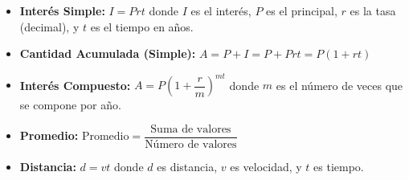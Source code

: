 \begin{itemize}
    \item \textbf{Interés Simple:} $I = Prt$ donde $I$ es el interés, $P$ es el principal, $r$ es la tasa (decimal), y $t$ es el tiempo en años.

    \item \textbf{Cantidad Acumulada (Simple):} $A = P + I = P + Prt = P(1 + rt)$

    \item \textbf{Interés Compuesto:} $A = P\left(1 + \dfrac{r}{m}\right)^{mt}$ donde $m$ es el número de veces que se compone por año.

    \item \textbf{Promedio:} $\text{Promedio} = \dfrac{\text{Suma de valores}}{\text{Número de valores}}$

    \item \textbf{Distancia:} $d = vt$ donde $d$ es distancia, $v$ es velocidad, y $t$ es tiempo.
\end{itemize}
